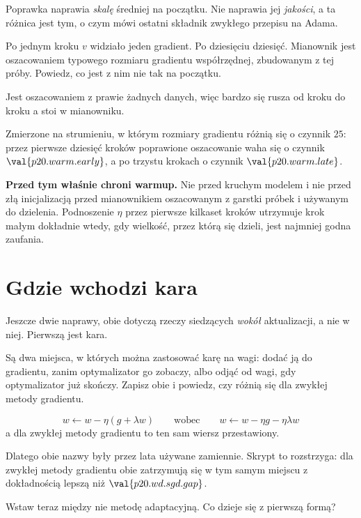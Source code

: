 \begin{fr}
Poprawka naprawia \emph{skalę} średniej na początku. Nie naprawia jej
\emph{jakości}, a ta różnica jest tym, o czym mówi ostatni składnik zwykłego
przepisu na Adama.

Po jednym kroku $v$ widziało jeden gradient. Po dziesięciu \dash{} dziesięć.
Mianownik jest oszacowaniem typowego rozmiaru gradientu współrzędnej,
zbudowanym z tej próby. Powiedz, co jest z nim nie tak na początku.
\nextframe
\end{fr}

\begin{fr}
\begin{ansblock}
Jest oszacowaniem z prawie żadnych danych, więc bardzo się rusza od kroku do
kroku \dash{} a stoi w mianowniku.
\end{ansblock}

Zmierzone na strumieniu, w którym rozmiary gradientu różnią się o czynnik $25$:
przez pierwsze dziesięć kroków poprawione oszacowanie waha się o czynnik
$\val{p20.warm.early}$, a po trzystu krokach o czynnik $\val{p20.warm.late}$.

\textbf{Przed tym właśnie chroni warmup.} Nie przed kruchym modelem i nie przed
złą inicjalizacją \dash{} przed mianownikiem oszacowanym z garstki próbek i
używanym do dzielenia. Podnoszenie $\eta$ przez pierwsze kilkaset kroków
utrzymuje krok małym dokładnie wtedy, gdy wielkość, przez którą się dzieli,
jest najmniej godna zaufania.
\end{fr}

\section{Gdzie wchodzi kara}
\label{sec:P20-decay}

\begin{fr}
Jeszcze dwie naprawy, obie dotyczą rzeczy siedzących \emph{wokół} aktualizacji,
a nie w niej. Pierwszą jest kara.

Są dwa miejsca, w których można zastosować karę na wagi: dodać ją do gradientu,
zanim optymalizator go zobaczy, albo odjąć od wagi, gdy optymalizator już
skończy. Zapisz obie i powiedz, czy różnią się dla zwykłej metody gradientu.
\dotline
\nextframe
\end{fr}

\begin{fr}
\begin{ansblock}
\[ w \leftarrow w - \eta(g + \lambda w) \qquad\text{wobec}\qquad
   w \leftarrow w - \eta g - \eta\lambda w \]
a dla zwykłej metody gradientu to ten sam wiersz przestawiony.
\end{ansblock}

Dlatego obie nazwy były przez lata używane zamiennie. Skrypt to rozstrzyga: dla
zwykłej metody gradientu obie zatrzymują się w tym samym miejscu z dokładnością
lepszą niż $\val{p20.wd.sgd.gap}$.


Wstaw teraz między nie metodę adaptacyjną. Co dzieje się z pierwszą formą?
\nextframe
\end{fr}

